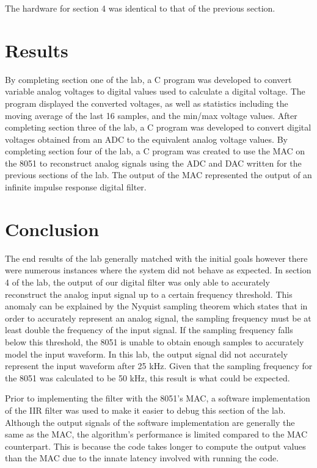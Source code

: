 \documentclass[12pt]{article}
\begin{document}
The hardware for section 4 was identical to that of the previous section. 

\section{Results}

By completing section one of the lab, a C program was developed to convert variable analog voltages to digital values used to calculate a digital voltage. The program displayed the converted voltages, as well as statistics including the moving average of the last 16 samples, and the min/max voltage values. After completing section three of the lab, a C program was developed to convert digital voltages obtained from an ADC to the equivalent analog voltage values. By completing section four of the lab, a C program was created to use the MAC on the 8051 to reconstruct analog signals using the ADC and DAC written for the previous sections of the lab. The output of the MAC represented the output of an infinite impulse response digital filter.


\section{Conclusion}


The end results of the lab generally matched with the initial goals however there were numerous instances where the system did not behave as expected. In section 4 of the lab, the output of our digital filter was only able to accurately reconstruct the analog input signal up to a certain frequency threshold. This anomaly can be explained by the Nyquist sampling theorem which states that in order to accurately represent an analog signal, the sampling frequency must be at least double the frequency of the input signal. If the sampling frequency falls below this threshold, the 8051 is unable to obtain enough samples to accurately model the input waveform. In this lab, the output signal did not accurately represent the input waveform after 25 kHz. Given that the sampling frequency for the 8051 was calculated to be 50 kHz, this result is what could be expected. 

Prior to implementing the filter with the 8051\textquoteright s MAC, a software implementation of the IIR filter was used to make it easier to debug this section of the lab. Although the output signals of the software implementation are generally the same as the MAC, the algorithm\textquoteright s performance is limited compared to the MAC counterpart. This is because the code takes longer to compute the output values than the MAC due to the innate latency involved with running the code. 
\end{document}
